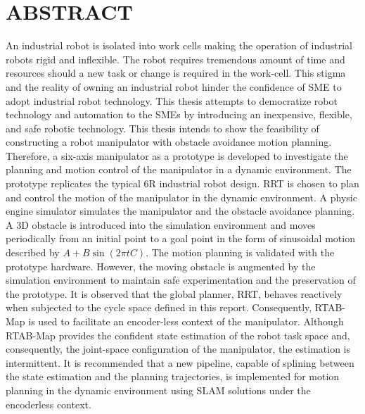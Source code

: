 

\chapter*{ABSTRACT}
\noindent
An industrial robot is isolated into work cells 
making the operation of industrial robots rigid and inflexible. The robot
requires tremendous amount of time and resources should a new task or change is required in 
the work-cell. 
This stigma and the reality of owning an industrial robot hinder the confidence of \acrfull{SME}
to adopt industrial robot technology. This thesis attempts to democratize robot 
technology and automation to the SMEs by introducing an inexpensive, flexible, and safe
robotic technology.
This thesis intends to show the feasibility of
constructing a robot manipulator with obstacle avoidance motion planning. 
Therefore, 
a six-axis 
manipulator as a prototype is developed to investigate the planning and motion control of the manipulator 
  in a dynamic environment.  
  The prototype replicates the typical 6R industrial robot design. \acrfull{RRT} is chosen to plan and control 
the motion of the manipulator in the dynamic environment. 
A physic engine simulator simulates the manipulator and 
the  obstacle avoidance planning.
A \acrfull{3D} obstacle is introduced into the simulation environment
and moves periodically from an initial
point to a goal point in the form of 
sinusoidal motion described by $A+B\sin{(2\pi tC)}$. 
The motion planning
is validated with the prototype hardware. However, the moving 
  obstacle is augmented by the simulation environment to maintain safe experimentation 
  and the preservation of the prototype. It is observed that
  the global planner, RRT, behaves reactively when subjected to the cycle space
  defined in this report.  
  Consequently, \acrfull{RTAB-Map} is used to facilitate an encoder-less context 
of the manipulator. 
Although RTAB-Map provides the confident state estimation 
  of the robot task space and, consequently, the joint-space configuration
  of the manipulator, the estimation is intermittent.
It is recommended that a new pipeline, 
capable of splining between the state estimation and the planning trajectories, is
  implemented for motion planning in the dynamic environment using \acrfull{SLAM} solutions under the encoderless context.
\newpage


